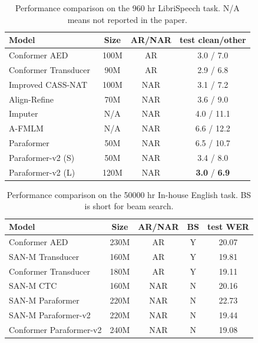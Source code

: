 \documentclass[runningheads]{llncs}
\begin{document}
\begin{table}
\caption{Performance comparison on the 960 hr LibriSpeech task. N/A means not reported in the paper.}
\centering
\begin{tabular}{l|c|c|c }
\hline
\textbf{Model} & \textbf{Size} & \textbf{AR/NAR} & \textbf{test clean/other} \\
\hline
Conformer AED~\cite{improve-cass-nat} & 100M & AR & 3.0 / 7.0 \\
Conformer Transducer~\cite{espnet_rnnt} & 90M & AR & 2.9 / 6.8 \\
Improved CASS-NAT~\cite{improve-cass-nat} & 100M & NAR & 3.1 / 7.2 \\
Align-Refine~\cite{align-refine} & 70M & NAR  & 3.6 / 9.0 \\
Imputer~\cite{imputer} & N/A & NAR & 4.0 / 11.1 \\
A-FMLM~\cite{A-FMLM} & N/A & NAR & 6.6 / 12.2 \\
Paraformer & 50M & NAR & 6.5 / 10.7 \\
\hline
Paraformer-v2 (S) & 50M & NAR & 3.4 / 8.0 \\
Paraformer-v2 (L) & 120M & NAR & \textbf{3.0} / \textbf{6.9} \\
\hline
\end{tabular}
\label{tab2}
\vspace{-0.25cm}
\end{table}
\begin{table}
\caption{Performance comparison on the 50000 hr In-house English task. BS is short for beam search.}
\centering
\begin{tabular}{l|c|c|c|c}
\hline
\textbf{Model} & \textbf{Size} & \textbf{AR/NAR} & \textbf{BS} &  \textbf{test WER} \\
\hline
Conformer AED & 230M & AR & Y & 20.07 \\
SAN-M Transducer & 160M & AR & Y & 19.81 \\
Conformer Transducer & 180M & AR & Y & 19.11 \\
SAN-M CTC & 160M & NAR &  N & 20.16 \\
SAN-M Paraformer & 220M & NAR &  N & 22.73 \\
\hline
SAN-M Paraformer-v2 & 220M & NAR & N & 19.44 \\
Conformer Paraformer-v2 & 240M & NAR & N & 19.08 \\
\hline
\end{tabular}
\label{tab3}
\vspace{-0.25cm}
\end{table}
\end{document}
